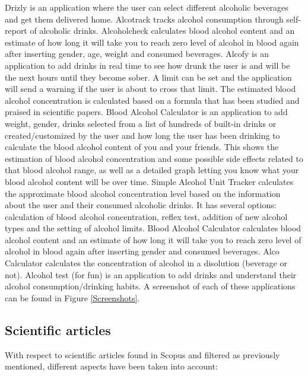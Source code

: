   Drizly \cite{Drizly} is an application where the user can select different alcoholic beverages and get them delivered home. Alcotrack \cite{alcotrack} tracks alcohol consumption through self-report of alcoholic drinks. Alcoholcheck \cite{alcoholcheck} calculates blood alcohol content and an estimate of how long it will take you to reach zero level of alcohol in blood again after inserting gender, age, weight and consumed beverages.
  Alcofy \cite{Alcofy} is an application to add drinks in real time to see how drunk the user is and will be the next hours until they become sober. A limit can be set and the application will send a warning if the user is about to cross that limit. The estimated blood alcohol concentration is calculated based on a formula that has been studied and praised in scientific papers. Blood Alcohol Calculator \cite{alcoholcalculator} is an application to add weight, gender, drinks selected from a list of hundreds of built-in drinks or created/customized by the user and how long the user has been drinking to calculate the blood alcohol content of you and your friends. This shows the estimation of blood alcohol concentration and some possible side effects related to that blood alcohol range, as well as a detailed graph letting you know what your blood alcohol content will be over time. Simple Alcohol Unit Tracker \cite{saut} calculates the approximate blood alcohol concentration level based on the information about the user and their consumed alcoholic drinks. It has several options: calculation of blood alcohol concentration, reflex test, addition of new alcohol types and the setting of alcohol limits.
  Blood Alcohol Calculator \cite{calculator} calculates blood alcohol content and an estimate of how long it will take you to reach zero level of alcohol in blood again after inserting gender and consumed beverages. Alco Calculator \cite{alcocal} calculates the concentration of alcohol in a disolution (beverage or not). Alcohol test (for fun) \cite{forfun} is an application to add drinks and understand their alcohol consumption/drinking habits. A screenshot of each of these applications can be found in Figure \ref{Screenshots}.


\subsection{Scientific articles}

With respect to scientific articles found in Scopus \cite{scopus} and filtered as previously mentioned, different aspects have been taken into account:

